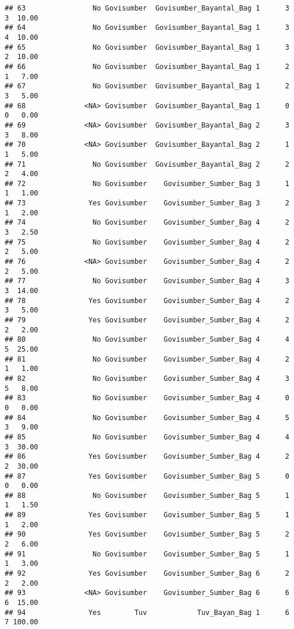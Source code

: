 \documentclass[
]{article}
\begin{document}
\begin{verbatim}
## 63                No Govisumber  Govisumber_Bayantal_Bag 1      3      3  10.00
## 64                No Govisumber  Govisumber_Bayantal_Bag 1      3      4  10.00
## 65                No Govisumber  Govisumber_Bayantal_Bag 1      3      2  10.00
## 66                No Govisumber  Govisumber_Bayantal_Bag 1      2      1   7.00
## 67                No Govisumber  Govisumber_Bayantal_Bag 1      2      3   5.00
## 68              <NA> Govisumber  Govisumber_Bayantal_Bag 1      0      0   0.00
## 69              <NA> Govisumber  Govisumber_Bayantal_Bag 2      3      3   8.00
## 70              <NA> Govisumber  Govisumber_Bayantal_Bag 2      1      1   5.00
## 71                No Govisumber  Govisumber_Bayantal_Bag 2      2      2   4.00
## 72                No Govisumber    Govisumber_Sumber_Bag 3      1      1   1.00
## 73               Yes Govisumber    Govisumber_Sumber_Bag 3      2      1   2.00
## 74                No Govisumber    Govisumber_Sumber_Bag 4      2      3   2.50
## 75                No Govisumber    Govisumber_Sumber_Bag 4      2      2   5.00
## 76              <NA> Govisumber    Govisumber_Sumber_Bag 4      2      2   5.00
## 77                No Govisumber    Govisumber_Sumber_Bag 4      3      3  14.00
## 78               Yes Govisumber    Govisumber_Sumber_Bag 4      2      3   5.00
## 79               Yes Govisumber    Govisumber_Sumber_Bag 4      2      2   2.00
## 80                No Govisumber    Govisumber_Sumber_Bag 4      4      5  25.00
## 81                No Govisumber    Govisumber_Sumber_Bag 4      2      1   1.00
## 82                No Govisumber    Govisumber_Sumber_Bag 4      3      5   8.00
## 83                No Govisumber    Govisumber_Sumber_Bag 4      0      0   0.00
## 84                No Govisumber    Govisumber_Sumber_Bag 4      5      3   9.00
## 85                No Govisumber    Govisumber_Sumber_Bag 4      4      3  30.00
## 86               Yes Govisumber    Govisumber_Sumber_Bag 4      2      2  30.00
## 87               Yes Govisumber    Govisumber_Sumber_Bag 5      0      0   0.00
## 88                No Govisumber    Govisumber_Sumber_Bag 5      1      1   1.50
## 89               Yes Govisumber    Govisumber_Sumber_Bag 5      1      1   2.00
## 90               Yes Govisumber    Govisumber_Sumber_Bag 5      2      2   6.00
## 91                No Govisumber    Govisumber_Sumber_Bag 5      1      1   3.00
## 92               Yes Govisumber    Govisumber_Sumber_Bag 6      2      2   2.00
## 93              <NA> Govisumber    Govisumber_Sumber_Bag 6      6      6  15.00
## 94               Yes        Tuv            Tuv_Bayan_Bag 1      6      7 100.00

\end{verbatim}
\end{document}
